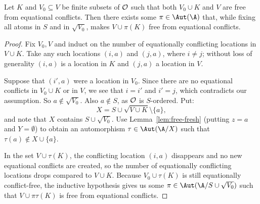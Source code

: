 \begin{lemma}\label{lem:?}
    Let $K$ and $V_0 \subseteq V$ be finite subsets of $\cal O$ such that 
    both $V_0\cup K$ and $V$ are free from equational conflicts.
    Then there exists some $\pi\in\Aut(\A)$ that, while fixing all atoms in $S$ and in $\sqrt{V_0}$, makes $V \cup \pi(K)$ free from equational conflicts.
\end{lemma}
\begin{proof}
    Fix $V_0, V$ and induct on the number of equationally conflicting locations in $V \cup K$. 
    Take any such locations $(i,a)$ and $(j,a)$, where $i \neq j$; 
    without loss of generality $(i,a)$ is a location in $K$ and $(j,a)$ a location in $V$. 

    Suppose that $(i', a)$ were a location in $V_0$.
    Since there are no equational conflicts in $V_0\cup K$ or in $V$, 
    we see that $i = i'$ and $i' = j$, which contradicts our assumption.
    So $a \not\in \sqrt{V_0}$.
    Also $a\not\in S$, as $\cal O$ is $S$-ordered.
    Put: 
    \[
        X = S \cup \sqrt{V \cup K} \setminus \{a\},
    \]
    and note that $X$ contains $S \cup \sqrt{V_0}$.
    Use Lemma~\ref{lem:free-fresh} (putting $z=a$ and $Y=\emptyset$) to obtain an automorphism $\tau \in \Aut(\A/X)$ such that $\tau(a) \not\in X \cup \{a\}$. 
    
    In the set $V\cup\tau(K)$, the conflicting location $(i,a)$ disappears and no new equational conflicts are created, 
    so the number of equationally conflicting locations drops compared to $V\cup K$.
    Because $V_0 \cup \tau(K)$ is still equationally conflict-free,
    the inductive hypothesis gives us some $\pi \in \Aut(\A / S \cup \sqrt{V_0})$ such that $V \cup \pi \tau(K)$ is free from equational conflicts.
\end{proof}

